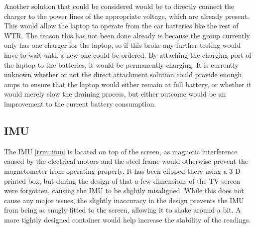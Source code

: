 Another solution that could be considered would be to directly connect the charger to the power lines of the appropriate voltage, which are already present.
This would allow the laptop to operate from the car batteries like the rest of WTR.
The reason this has not been done already is because the group currently only has one charger for the laptop, so if this broke any further testing would have to wait until a new one could be ordered.
By attaching the charging port of the laptop to the batteries, it would be permanently charging.
It is currently unknown whether or not the direct attachment solution could provide enough amps to ensure that the laptop would either remain at full battery, or whether it would merely slow the draining process, but either outcome would be an improvement to the current battery consumption.


\subsection{IMU}
The IMU \ref{trm::imu} is located on top of the screen, as magnetic interference caused by the electrical motors and the steel frame would otherwise prevent the magnetometer from operating properly.
It has been clipped there using a 3-D printed box, but during the design of that a few dimensions of the TV screen were forgotten, causing the IMU to be slightly misaligned.
While this does not cause any major issues, the slightly inaccuracy in the design prevents the IMU from being as snugly fitted to the screen, allowing it to shake around a bit.
A more tightly designed container would help increase the stability of the readings.

\newpage
